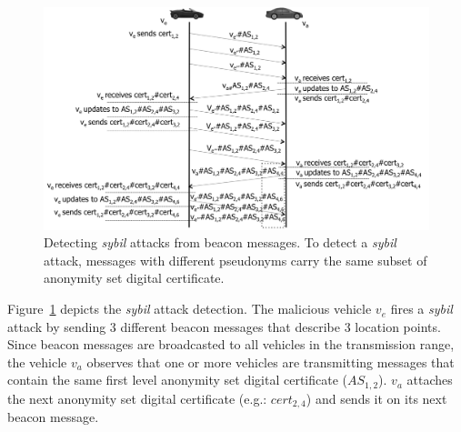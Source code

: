 \documentclass[preprint,12pt]{elsarticle}
\begin{document}


\begin{figure}[h]
\begin{center}
\includegraphics[width=4.5in]{figures/cenario-sybil-5-execution-en.png}
\caption{
Detecting \textit{sybil} attacks from beacon messages. To detect a \textit{sybil} attack, messages with different pseudonyms carry the same subset of anonymity set digital certificate.}
\label{fig:sybildetectionexecution}
\end{center}
\end{figure}

Figure~\ref{fig:sybildetectionexecution} depicts the \textit{sybil} attack detection. The malicious vehicle $v_{e}$ fires a \textit{sybil} attack by sending 3 different beacon messages that describe 3 location points. Since beacon messages are broadcasted to all vehicles in the transmission range, the vehicle $v_{a}$ observes that one or more vehicles are transmitting messages that contain the same first level anonymity set digital certificate ($AS_{1, 2}$). $v_{a}$ attaches the next anonymity set digital certificate (e.g.: $cert_{2,4}$) and sends it on its next beacon message.
\end{document}
